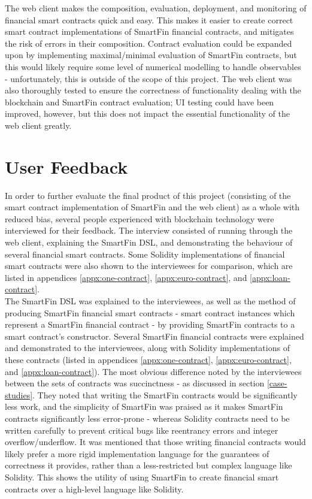 The web client makes the composition, evaluation, deployment, and monitoring of financial smart contracts quick and easy. This makes it easier to create correct smart contract implementations of SmartFin financial contracts, and mitigates the risk of errors in their composition. Contract evaluation could be expanded upon by implementing maximal/minimal evaluation of SmartFin contracts, but this would likely require some level of numerical modelling to handle observables - unfortunately, this is outside of the scope of this project. The web client was also thoroughly tested to ensure the correctness of functionality dealing with the blockchain and SmartFin contract evaluation; UI testing could have been improved, however, but this does not impact the essential functionality of the web client greatly.


\section{User Feedback} \label{user-feedback}

In order to further evaluate the final product of this project (consisting of the smart contract implementation of SmartFin and the web client) as a whole with reduced bias, several people experienced with blockchain technology were interviewed for their feedback. The interview consisted of running through the web client, explaining the SmartFin DSL, and demonstrating the behaviour of several financial smart contracts. Some Solidity implementations of financial smart contracts were also shown to the interviewees for comparison, which are listed in appendices \ref{appx:one-contract}, \ref{appx:euro-contract}, and \ref{appx:loan-contract}. \\

The SmartFin DSL was explained to the interviewees, as well as the method of producing SmartFin financial smart contracts - smart contract instances which represent a SmartFin financial contract - by providing SmartFin contracts to a smart contract's constructor. Several SmartFin financial contracts were explained and demonstrated to the interviewees, along with Solidity implementations of these contracts (listed in appendices \ref{appx:one-contract}, \ref{appx:euro-contract}, and \ref{appx:loan-contract}). The most obvious difference noted by the interviewees between the sets of contracts was succinctness - as discussed in section \ref{case-studies}. They noted that writing the SmartFin contracts would be significantly less work, and the simplicity of SmartFin was praised as it makes SmartFin contracts significantly less error-prone - whereas Solidity contracts need to be written carefully to prevent critical bugs like reentrancy errors and integer overflow/underflow. It was mentioned that those writing financial contracts would likely prefer a more rigid implementation language for the guarantees of correctness it provides, rather than a less-restricted but complex language like Solidity. This shows the utility of using SmartFin to create financial smart contracts over a high-level language like Solidity. \\

